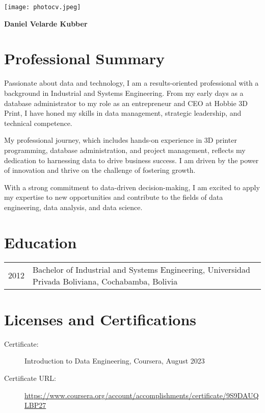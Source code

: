 \documentclass[a4paper,10pt]{article}
\begin{document}
\begin{minipage}[t]{0.7\textwidth}
\end{minipage}
\hfill
\begin{minipage}[t]{0.3\textwidth}
  \texttt{[image: photocv.jpeg]}
\end{minipage}

\begin{center}
\textbf{\LARGE Daniel Velarde Kubber}
\end{center}

\section*{Professional Summary}
Passionate about data and technology, I am a results-oriented professional with a background in Industrial and Systems Engineering. From my early days as a database administrator to my role as an entrepreneur and CEO at Hobbie 3D Print, I have honed my skills in data management, strategic leadership, and technical competence.

My professional journey, which includes hands-on experience in 3D printer programming, database administration, and project management, reflects my dedication to harnessing data to drive business success. I am driven by the power of innovation and thrive on the challenge of fostering growth.

With a strong commitment to data-driven decision-making, I am excited to apply my expertise to new opportunities and contribute to the fields of data engineering, data analysis, and data science.

\section*{Education}
\begin{tabular}{p{3cm}p{12cm}}
    2012 & Bachelor of Industrial and Systems Engineering, Universidad Privada Boliviana, Cochabamba, Bolivia \\
\end{tabular}

\section*{Licenses and Certifications}
\begin{description}
    \item[Certificate:] Introduction to Data Engineering, Coursera, August 2023
    \item[Certificate URL:] \url{https://www.coursera.org/account/accomplishments/certificate/9S9DAUQLBP27}
\end{description}
\end{document}
